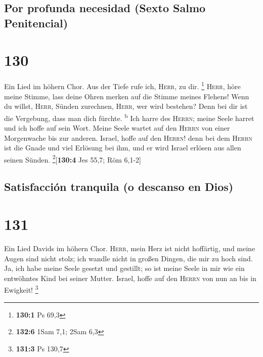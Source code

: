 \hypertarget{por-profunda-necesidad-sexto-salmo-penitencial}{%
\subsection{Por profunda necesidad (Sexto Salmo
Penitencial)}\label{por-profunda-necesidad-sexto-salmo-penitencial}}

\hypertarget{section-129}{%
\section{130}\label{section-129}}

 Ein Lied im höhern Chor. Aus der Tiefe rufe ich,
\textsc{Herr}, zu dir. \footnote{\textbf{130:1} Ps 69,3} 
\textsc{Herr}, höre meine Stimme, lass deine Ohren merken auf die Stimme
meines Flehens!  Wenn du willst, \textsc{Herr}, Sünden
zurechnen, \textsc{Herr}, wer wird bestehen?  Denn bei dir
ist die Vergebung, dass man dich fürchte. \textsuperscript{b}
 Ich harre des \textsc{Herrn}; meine Seele harret und ich
hoffe auf sein Wort.  Meine Seele wartet auf den
\textsc{Herrn} von einer Morgenwache bis zur anderen. 
Israel, hoffe auf den \textsc{Herrn}! denn bei dem \textsc{Herrn} ist
die Gnade und viel Erlösung bei ihm,  und er wird Israel
erlösen aus allen seinen Sünden. \footnote{\textbf{132:6} 1Sam 7,1; 2Sam
  6,3}{[}\textbf{130:4} Jes 55,7; Röm 6,1-2{]}

\hypertarget{satisfacciuxf3n-tranquila-o-descanso-en-dios}{%
\subsection{Satisfacción tranquila (o descanso en
Dios)}\label{satisfacciuxf3n-tranquila-o-descanso-en-dios}}

\hypertarget{section-130}{%
\section{131}\label{section-130}}

 Ein Lied Davids im höhern Chor. \textsc{Herr}, mein Herz
ist nicht hoffärtig, und meine Augen sind nicht stolz; ich wandle nicht
in großen Dingen, die mir zu hoch sind.  Ja, ich habe
meine Seele gesetzt und gestillt; so ist meine Seele in mir wie ein
entwöhntes Kind bei seiner Mutter.  Israel, hoffe auf den
\textsc{Herrn} von nun an bis in Ewigkeit! \footnote{\textbf{131:3} Ps
  130,7}

